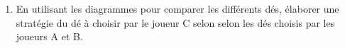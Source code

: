 \documentclass[main.tex]{subfiles}
\begin{document}
\begin{exercise}
\begin{enumerate}[label=\arabic*),leftmargin=*]
{	\null\hfill bat \hfill ;
}
\parbox{0.30\linewidth}{
	\noindent\begin{tabular}{|*5{c|}}
		\cline{3-5}
		\multicolumn{2}{c|}{\multirow{2}{*}{}} & \multicolumn{3}{l|}{Dé  }  \\ \cline{3-5}
		\multicolumn{2}{c|}{}   &  \rule{0pt}{1.em}\rule{0.8em}{0pt} &  \rule{0pt}{1.em} \rule{0.8em}{0pt} &\rule{0pt}{1.em}\rule{0.9em}{0pt}    \\ \hline
		\multirow{3}{*}{\rotatebox[origin=c]{90}{Dé \qquad}}	  
		& \rule{0pt}{1.0em}\rule{1.em}{0pt}   &    &   &   \\ \cline{2-5}
		& \rule{0pt}{1.0em}  &   &    &   \\ \cline{2-5} 
		& \rule{0pt}{1.0em}  &   &   &     \\ \hline
	\end{tabular}
	
	\null\hfill bat \hfill ;
}
		\item En utilisant les diagrammes pour comparer les différents dés, élaborer une stratégie du dé à choisir par le joueur C selon selon les dés choisis par les joueurs A		et B.
	\end{enumerate} 
\end{exercise}
\end{document}
